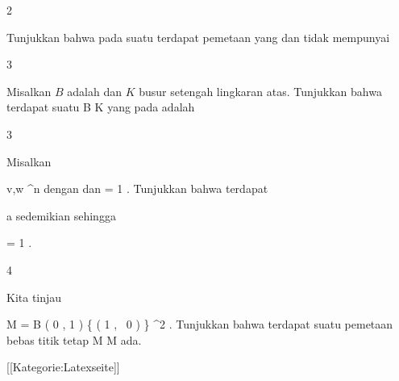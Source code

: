{2}
{

Tunjukkan bahwa pada suatu
terdapat pemetaan
 yang
dan tidak mempunyai

}
{} {}

{3}
{

Misalkan $B$ adalah
dan $K$ busur setengah lingkaran atas. Tunjukkan bahwa terdapat suatu
\maabbdisp {\varphi} { B } { K
} {}
yang
pada
 adalah

}
{} {}

{3}
{

Misalkan

\mavergleichskette
{\vergleichskette
{ v,w
}
{ \in }{ \R^n
}
{  }{
}
{    }{
}
{   }{
}
}
{}{}{}
dengan
\mathkor {} { \Vert {}} {dan} { \Vert = 1} {.}
Tunjukkan bahwa terdapat

\mavergleichskette
{\vergleichskette
{ a
}
{ \in }{ \R
}
{  }{
}
{    }{
}
{   }{
}
}
{}{}{}
sedemikian sehingga

\mavergleichskette
{\vergleichskette
{  \Vert
}
{ = }{ 1
}
{  }{
}
{    }{
}
{   }{
}
}
{}{}{.}

}
{} {}

{4}
{

Kita tinjau

\mavergleichskettedisp
{\vergleichskette
{ M
}
{ =} { B  \left(  0 , 1 \right) \setminus \{  \left(  1   , \,   0                   \right) \}
}
{ \subseteq} { \R^2
}
{ } {
}
{ } {
}
}
{}{}{.}
Tunjukkan bahwa terdapat suatu pemetaan bebas titik tetap
\maabbdisp {\varphi} { M } { M
} {}
ada.

}
{} {}

 [[Kategorie:Latexseite]]
